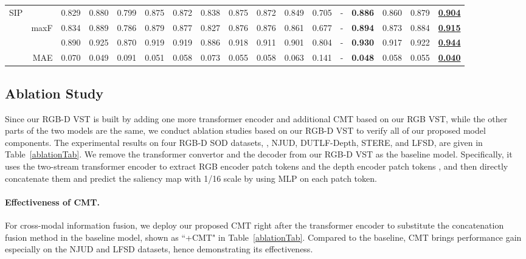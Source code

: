 \documentclass[10pt,twocolumn,letterpaper]{article}
\def\blu#1{\textbf{\color{blue} #1}} \def\red#1{\textbf{\color{red}\underline{#1}}}
\begin{document}
\begin{table*}[t]
\begin{tabular}{lr|cccccccccccccc|c}
  \multirow{4}{*}{SIP}
    &   &0.829 &0.880 &0.799 &0.875 &0.872 &0.838 &0.875 &0.872 &0.849 &0.705 &- &\blu{0.886} &0.860 &0.879 &\red{0.904}\\
    & maxF  &0.834 &0.889 &0.786 &0.879 &0.877 &0.827 &0.876 &0.876 &0.861 &0.677 &- &\blu{0.894} &0.873 &0.884 &\red{0.915}\\
    &   &0.890 &0.925 &0.870 &0.919 &0.919 &0.886 &0.918 &0.911 &0.901 &0.804 &- &\blu{0.930} &0.917 &0.922 &\red{0.944}\\
    \cite{fan2020SIP} & MAE &0.070 &0.049 &0.091 &0.051 &0.058 &0.073 &0.055 &0.058 &0.063 &0.141 &- &\blu{0.048} &0.058 &0.055 &\red{0.040}\\
     \hline

  \end{tabular}
  \label{RGBD_SOTA}
   \vspace{-4mm}
\end{table*}

\subsection{Ablation Study}\label{sec:ablation}
Since our RGB-D VST is built by adding one more transformer encoder and additional CMT based on our RGB VST, while the other parts of the two models are the same, we conduct ablation studies based on our RGB-D VST to verify all of our proposed model components.
The experimental results on four RGB-D SOD datasets, \ie, NJUD, DUTLF-Depth, STERE, and LFSD, are given in Table~\ref{ablationTab}.
We remove the transformer convertor and the decoder from our RGB-D VST as the baseline model. 
Specifically, it uses the two-stream transformer encoder to extract RGB encoder patch tokens  and the depth encoder patch tokens , and then directly concatenate them and predict the saliency map with 1/16 scale by using MLP on each patch token.

\vspace{-3mm}
\paragraph{Effectiveness of CMT.}
For cross-modal information fusion, we deploy our proposed CMT right after the transformer encoder to substitute the concatenation fusion method in the baseline model, shown as ``+CMT" in Table~\ref{ablationTab}.
Compared to the baseline, CMT brings performance gain especially on the NJUD and LFSD datasets, hence demonstrating its effectiveness.

\vspace{-3mm}
\end{document}
